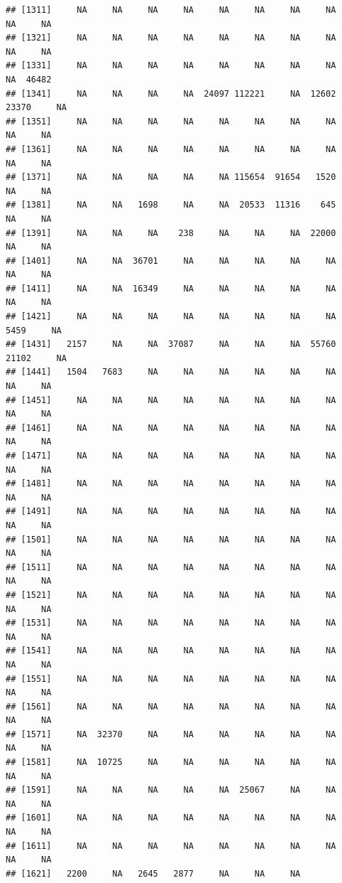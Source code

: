 \documentclass[11pt,a4paper,]{article}
\begin{document}
\begin{verbatim}
## [1311]     NA     NA     NA     NA     NA     NA     NA     NA     NA     NA
## [1321]     NA     NA     NA     NA     NA     NA     NA     NA     NA     NA
## [1331]     NA     NA     NA     NA     NA     NA     NA     NA     NA  46482
## [1341]     NA     NA     NA     NA  24097 112221     NA  12602  23370     NA
## [1351]     NA     NA     NA     NA     NA     NA     NA     NA     NA     NA
## [1361]     NA     NA     NA     NA     NA     NA     NA     NA     NA     NA
## [1371]     NA     NA     NA     NA     NA 115654  91654   1520     NA     NA
## [1381]     NA     NA   1698     NA     NA  20533  11316    645     NA     NA
## [1391]     NA     NA     NA    238     NA     NA     NA  22000     NA     NA
## [1401]     NA     NA  36701     NA     NA     NA     NA     NA     NA     NA
## [1411]     NA     NA  16349     NA     NA     NA     NA     NA     NA     NA
## [1421]     NA     NA     NA     NA     NA     NA     NA     NA   5459     NA
## [1431]   2157     NA     NA  37087     NA     NA     NA  55760  21102     NA
## [1441]   1504   7683     NA     NA     NA     NA     NA     NA     NA     NA
## [1451]     NA     NA     NA     NA     NA     NA     NA     NA     NA     NA
## [1461]     NA     NA     NA     NA     NA     NA     NA     NA     NA     NA
## [1471]     NA     NA     NA     NA     NA     NA     NA     NA     NA     NA
## [1481]     NA     NA     NA     NA     NA     NA     NA     NA     NA     NA
## [1491]     NA     NA     NA     NA     NA     NA     NA     NA     NA     NA
## [1501]     NA     NA     NA     NA     NA     NA     NA     NA     NA     NA
## [1511]     NA     NA     NA     NA     NA     NA     NA     NA     NA     NA
## [1521]     NA     NA     NA     NA     NA     NA     NA     NA     NA     NA
## [1531]     NA     NA     NA     NA     NA     NA     NA     NA     NA     NA
## [1541]     NA     NA     NA     NA     NA     NA     NA     NA     NA     NA
## [1551]     NA     NA     NA     NA     NA     NA     NA     NA     NA     NA
## [1561]     NA     NA     NA     NA     NA     NA     NA     NA     NA     NA
## [1571]     NA  32370     NA     NA     NA     NA     NA     NA     NA     NA
## [1581]     NA  10725     NA     NA     NA     NA     NA     NA     NA     NA
## [1591]     NA     NA     NA     NA     NA  25067     NA     NA     NA     NA
## [1601]     NA     NA     NA     NA     NA     NA     NA     NA     NA     NA
## [1611]     NA     NA     NA     NA     NA     NA     NA     NA     NA     NA
## [1621]   2200     NA   2645   2877     NA     NA     NA
\end{verbatim}
\end{document}
